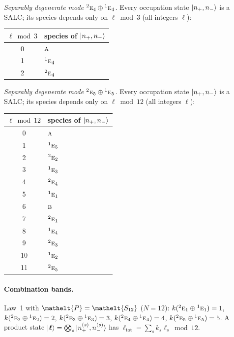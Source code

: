 \documentclass[11pt]{article}
\newcommand{\eltfont}[1]{{\let\sigma\eltsigma\mathelt{#1}}}
\newcommand{\irr}[1]{\text{\normalfont\scshape #1}}
\newcommand{\conjpair}[1]{{}^{#1}}
\newcommand{\elt}[1]{\eltfont{#1}}
\newcommand{\pel}{\elt{P}}             %
\begin{document}
\emph{Separably degenerate mode $\conjpair{2}\irr{e}_{4}\oplus \conjpair{1}\irr{e}_{4}$.} Every occupation state $\ket{n_+,n_-}$ is a SALC; its species depends only on $\ell\bmod 3$ (all integers $\ell$):
\begin{longtable}{c l}\hline $\ell\bmod 3$ & species of $\ket{n_+,n_-}$\\ \hline\endhead
0 & $\irr{a}$\\
1 & $\conjpair{1}\irr{e}_{4}$\\
2 & $\conjpair{2}\irr{e}_{4}$\\
\hline\end{longtable}

\emph{Separably degenerate mode $\conjpair{2}\irr{e}_{5}\oplus \conjpair{1}\irr{e}_{5}$.} Every occupation state $\ket{n_+,n_-}$ is a SALC; its species depends only on $\ell\bmod 12$ (all integers $\ell$):
\begin{longtable}{c l}\hline $\ell\bmod 12$ & species of $\ket{n_+,n_-}$\\ \hline\endhead
0 & $\irr{a}$\\
1 & $\conjpair{1}\irr{e}_{5}$\\
2 & $\conjpair{2}\irr{e}_{2}$\\
3 & $\conjpair{1}\irr{e}_{3}$\\
4 & $\conjpair{2}\irr{e}_{4}$\\
5 & $\conjpair{1}\irr{e}_{1}$\\
6 & $\irr{b}$\\
7 & $\conjpair{2}\irr{e}_{1}$\\
8 & $\conjpair{1}\irr{e}_{4}$\\
9 & $\conjpair{2}\irr{e}_{3}$\\
10 & $\conjpair{1}\irr{e}_{2}$\\
11 & $\conjpair{2}\irr{e}_{5}$\\
\hline\end{longtable}

\paragraph{Combination bands.}

Law~1 with $\pel=\elt{S_{12}}$ ($N=12$): $k(\conjpair{2}\irr{e}_{1}\oplus \conjpair{1}\irr{e}_{1})=1$, $k(\conjpair{2}\irr{e}_{2}\oplus \conjpair{1}\irr{e}_{2})=2$, $k(\conjpair{2}\irr{e}_{3}\oplus \conjpair{1}\irr{e}_{3})=3$, $k(\conjpair{2}\irr{e}_{4}\oplus \conjpair{1}\irr{e}_{4})=4$, $k(\conjpair{2}\irr{e}_{5}\oplus \conjpair{1}\irr{e}_{5})=5$. A product state $\ket{\boldsymbol\ell}=\bigotimes_s\ket{n_+^{(s)},n_-^{(s)}}$ has $\ell_{\mathrm{tot}}=\sum_sk_s\ell_s\bmod 12$.
\end{document}
